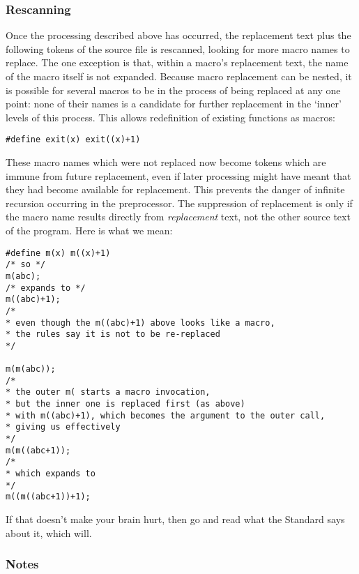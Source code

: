    

   \subsubsection{Rescanning}
    

    Once the processing described above has occurred, the replacement
     text plus the following tokens of the source file is rescanned, looking
     for more macro names to replace. The one exception is that, within
     a macro's replacement text, the name of the macro itself is not
     expanded. Because macro replacement can be nested, it is possible for
     several macros to be in the process of being replaced at any one point:
     none of their names is a candidate for further replacement in the
     `inner' levels of this process. This allows redefinition of
     existing functions as macros:


    \begin{Verbatim}
#define exit(x) exit((x)+1)
\end{Verbatim}

    These macro names which were not replaced now become tokens which are
     immune from future replacement, even if later processing might have
     meant that they had become available for replacement. This prevents the
     danger of infinite recursion occurring in the preprocessor. The
     suppression of replacement is only if the macro name results directly
     from \textit{replacement} text, not the other source text of the
     program. Here is what we mean:


    \begin{Verbatim}
#define m(x) m((x)+1)
/* so */
m(abc);
/* expands to */
m((abc)+1);
/*
* even though the m((abc)+1) above looks like a macro,
* the rules say it is not to be re-replaced
*/

m(m(abc));
/*
* the outer m( starts a macro invocation,
* but the inner one is replaced first (as above)
* with m((abc)+1), which becomes the argument to the outer call,
* giving us effectively
*/
m(m((abc+1));
/*
* which expands to
*/
m((m((abc+1))+1);
\end{Verbatim}

    If that doesn't make your brain hurt, then go and read what the
     Standard says about it, which will.


   

   \subsubsection{Notes}
    

